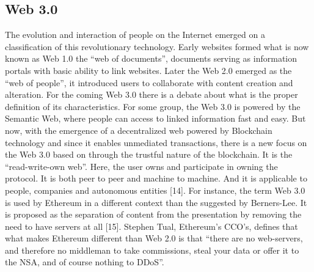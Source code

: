 \subsection{Web 3.0}\cite{Hector}
The evolution and interaction of people on the Internet
emerged on a classification of this revolutionary technology.
Early websites formed what is now known as Web 1.0 the
“web of documents”, documents serving as information portals
with basic ability to link websites. Later the Web 2.0 emerged
as the “web of people”, it introduced users to collaborate
with content creation and alteration. For the coming Web 3.0
there is a debate about what is the proper definition of its
characteristics. For some group, the Web 3.0 is powered by the
Semantic Web, where people can access to linked information
fast and easy. But now, with the emergence of a decentralized
web powered by Blockchain technology and since it enables
unmediated transactions, there is a new focus on the Web 3.0
based on through the trustful nature of the blockchain. It is
the “read-write-own web”. Here, the user owns and participate
in owning the protocol. It is both peer to peer and machine
to machine. And it is applicable to people, companies and
autonomous entities [14].
For instance, the term Web 3.0 is used by Ethereum in
a different context than the suggested by Berners-Lee. It is
proposed as the separation of content from the presentation
by removing the need to have servers at all [15]. Stephen
Tual, Ethereum’s CCO’s, defines that what makes Ethereum
different than Web 2.0 is that “there are no web-servers, and
therefore no middleman to take commissions, steal your data
or offer it to the NSA, and of course nothing to DDoS”.


